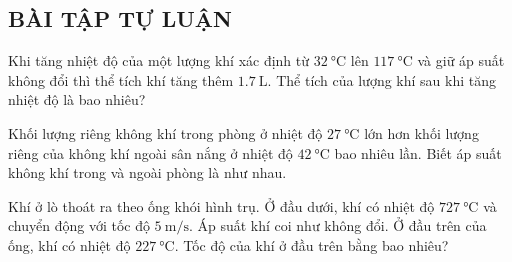 \subsection{BÀI TẬP TỰ LUẬN}
\setcounter{ex}{0}
\begin{ex}
	Khi tăng nhiệt độ của một lượng khí xác định từ $\SI{32}{\celsius}$ lên $\SI{117}{\celsius}$ và giữ áp suất không đổi thì thể tích khí tăng thêm $\SI{1.7}{\liter}$. Thể tích của lượng khí sau khi tăng nhiệt độ là bao nhiêu?
\end{ex}
\begin{ex}
	Khối lượng riêng không khí trong phòng ở nhiệt độ $\SI{27}{\celsius}$ lớn hơn khối lượng riêng của không khí ngoài sân nắng ở nhiệt độ $\SI{42}{\celsius}$ bao nhiêu lần. Biết áp suất không khí trong và ngoài phòng là như nhau.
\end{ex}
\begin{ex}
	Khí ở lò thoát ra theo ống khói hình trụ. Ở đầu dưới, khí có nhiệt độ $\SI{727}{\celsius}$ và chuyển động với tốc độ $\SI{5}{\meter/\second}$. Áp suất khí coi như không đổi. Ở đầu trên của ống, khí có nhiệt độ $\SI{227}{\celsius}$. Tốc độ của khí ở đầu trên bằng bao nhiêu?
\end{ex}
	
	
